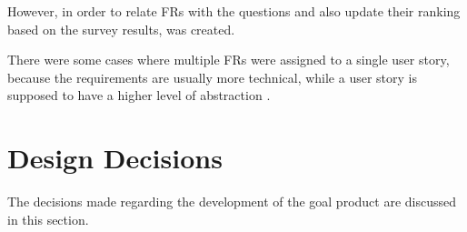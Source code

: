 




However, in order to relate \acp{FR} with the questions and also update their ranking based on the survey results,  was created.



There were some cases where multiple \acp{FR} were assigned to a single user story, because the requirements are usually more technical, while a user story is supposed to have a higher level of abstraction \cite{DIMITRIJEVIC2015352}.

\section{Design Decisions}\label{ext:design-decisions}

The decisions made regarding the development of the goal product are discussed in this section.

